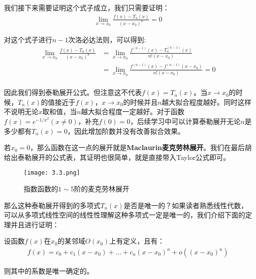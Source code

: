 \documentclass{ctexart}
\let\oldtextbf\textbf %
\renewcommand{\textbf}[1]{\textcolor{btex}{\oldtextbf{#1}}} %
\begin{document}
我们接下来需要证明这个式子成立，我们只需要证明：
\begin{align*}
    \lim_{x\to x_0}\frac{f(x)-T_n(x)}{(x-x_0)^n}=0
\end{align*}

对这个式子进行$n-1$次洛必达法则，可以得到:
\begin{align*}
    \lim_{x\to x_0}\frac{f(x)-T_n(x)}{(x-x_0)^n}&=\lim_{x\to x_0}\frac{f^{(n-1)}(x)-T_n^{(n-1)}(x)}{n!(x-x_0)}\\
    &=\lim_{x\to x_0}\frac{f^{(n-1)}(x)-f^{(n-1)}(x-x_0)}{n!(x-x_0)}=0\\
\end{align*}

因此我们得到泰勒展开公式。但注意这不代表$f(x)=T_n(x)$。当$x\to x_0$的时候，$T_n(x)$的值接近于$f(x)$，$x\to x_0$的时候并且$n$越大拟合程度越好。同时这样不说明无论$x$取和值，当$n$越大拟合程度一定越好。对于函数$f(x)=e^{-1/x^2}(x\neq 0)$，补充$f(0)=0$，后续学习中可以计算泰勒展开无论$n$是多少都有$T_n(x)=0$，因此增加阶数并没有改善拟合效果。

若$x_0=0$，那么函数在这一点的展开就是\textbf{Maclaurin麦克劳林展开}。我们在最后胡给出泰勒展开的公式表，其证明也很简单，就是直接带入Taylor公式即可。
\begin{figure}[H]    
\centering     
\renewcommand{\figurename}{图}     
\renewcommand{\thefigure}{3.3}    
\begin{myimagebox}[width=0.5\textwidth] %
\texttt{[image: 3.3.png]} %
\end{myimagebox}     
\caption{\label{fig:3.3}指数函数的$1\sim 5$阶的麦克劳林展开}   
\end{figure}

那么这种泰勒展开得到的多项式$T_n(x)$是否是唯一的？如果读者熟悉线性代数，可以从多项式线性空间的线性性理解这种多项式一定是唯一的，我们介绍下面的定理并且进行证明：
\begin{tcolorbox}[
    colback=bac1,     %
    colframe=fra1,   %
    coltitle=white,             %
    coltext=tex1,
    title=Taylor展开的唯一性,
    fonttitle=\bfseries,        %
arc=3mm,                     %
breakable
]
设函数$f(x)$在$x_0$的某邻域$O(x_0)$上有定义，且有：
\begin{align*}
    f(x)=c_0+c_1(x-x_0)+...+c_n(x-x_0)^n+o((x-x_0)^n)
\end{align*}

则其中的系数是唯一确定的。
\end{tcolorbox}
\end{document}
